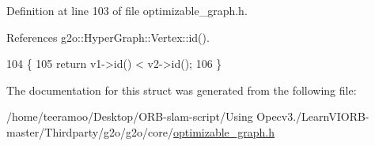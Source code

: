 Definition at line 103 of file optimizable\+\_\+graph.\+h.



References g2o\+::\+Hyper\+Graph\+::\+Vertex\+::id().


\begin{DoxyCode}
104       \{
105         \textcolor{keywordflow}{return} v1->id() < v2->id();
106       \}
\end{DoxyCode}


The documentation for this struct was generated from the following file\+:\begin{DoxyCompactItemize}
\item 
/home/teeramoo/\+Desktop/\+O\+R\+B-\/slam-\/script/\+Using Opecv3./\+Learn\+V\+I\+O\+R\+B-\/master/\+Thirdparty/g2o/g2o/core/\hyperlink{optimizable__graph_8h}{optimizable\+\_\+graph.\+h}\end{DoxyCompactItemize}
